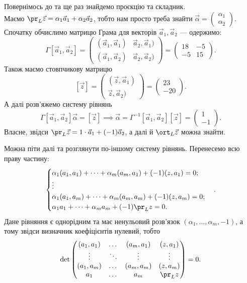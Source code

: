 \documentclass{math_library}
\begin{document}
\begin{example}
Повернімось до  та ще раз знайдемо проєкцію та складник.\\
Маємо $\pr_L \vec{z} = \alpha_1 \vec{a}_1 + \alpha_2 \vec{a}_2$, тобто нам просто треба знайти $\vec{\alpha} = \begin{pmatrix}
\alpha_1 \\ \alpha_2
\end{pmatrix}$. Спочатку обчислимо матрицю Грама для векторів $\vec{a}_1,\vec{a}_2$ --- одержимо:
\[
\Gamma[\vec{a}_1,\vec{a}_2] = \begin{pmatrix}
(\vec{a}_1,\vec{a}_1) & \vec{a}_2, \vec{a}_1) \\
(\vec{a}_1,\vec{a}_2) & \vec{a}_2, \vec{a}_2) 
\end{pmatrix} = \begin{pmatrix}
18 & -5 \\
-5 & 15
\end{pmatrix}.
\]
Також маємо стовпчикову матрицю
\[ 
[\vec{z}] = \begin{pmatrix}
(\vec{z},\vec{a}_1) \\
\vec{z},\vec{a}_2)
\end{pmatrix} = \begin{pmatrix}
23 \\ -20
\end{pmatrix}.
\]
А далі розв'яжемо систему рівнянь 
\[
\Gamma[\vec{a}_1,\vec{a}_2] \vec{\alpha} = [\vec{z}] \implies \vec{\alpha} = \Gamma^{-1}[\vec{a}_1,\vec{a}_2] [\vec{z}] = \begin{pmatrix}
1 \\ -1
\end{pmatrix}.
\]
Власне, звідси $\pr_L \vec{z} = 1 \cdot \vec{a}_1 + (-1) \vec{a}_2$, а далі й $\ort_L \vec{z}$ можна знайти.
\end{example}
\noindent
Можна піти далі та розглянути по-іншому систему рівнянь. Перенесемо всю праву частину:
\[
\begin{cases}
\alpha_1 (a_1,a_1) + \dots + \alpha_m (a_m,a_1) + (-1) (z,a_1) = 0; \\
\vdots \\
\alpha_1 (a_1,a_m) + \dots + \alpha_m (a_m,a_m) + (-1) (z,a_m) = 0; \\
\alpha_1 a_1 + \dots + \alpha_m a_m + (-1) \pr_L z = 0.
\end{cases}.
\]
Дане рівняння є однорідним та має ненульовий розв'язок $(\alpha_1,\dots,\alpha_m,-1)$, а тому звідси визначник коефіцієнтів нулевий, тобто
\[
\det \begin{pmatrix}
(a_1,a_1) & \dots & (a_m,a_1) & (z,a_1) \\
\vdots & \ddots & \vdots & \vdots \\
(a_1,a_m) & \dots & (a_m,a_m) & (z,a_m) \\
a_1 & \dots & a_m & \pr_L z
\end{pmatrix} = 0.
\]
\end{document}
